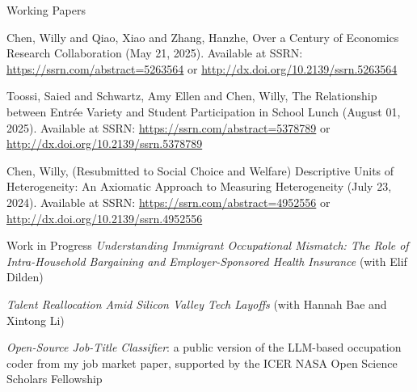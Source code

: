 \documentclass{resume} %
\begin{document}
\begin{rSection}{Working Papers}

Chen, Willy and Qiao, Xiao and Zhang, Hanzhe, Over a Century of Economics Research Collaboration (May 21, 2025). Available at SSRN: \url{https://ssrn.com/abstract=5263564} or \url{http://dx.doi.org/10.2139/ssrn.5263564}

Toossi, Saied and Schwartz, Amy Ellen and Chen, Willy, The Relationship between Entrée Variety and Student Participation in School Lunch (August 01, 2025). Available at SSRN: \url{https://ssrn.com/abstract=5378789} or \url{http://dx.doi.org/10.2139/ssrn.5378789}

Chen, Willy, (Resubmitted to Social Choice and Welfare) Descriptive Units of Heterogeneity: An Axiomatic Approach to Measuring Heterogeneity (July 23, 2024). Available at SSRN: \url{https://ssrn.com/abstract=4952556} or \url{http://dx.doi.org/10.2139/ssrn.4952556}




\end{rSection}




\begin{rSection}{Work in Progress}
\textit{Understanding Immigrant Occupational Mismatch: The Role of Intra-Household Bargaining and Employer-Sponsored Health Insurance }(with Elif Dilden)

\textit{Talent Reallocation Amid Silicon Valley Tech Layoffs} (with Hannah Bae and Xintong Li)

\textit{Open-Source Job-Title Classifier}: a public version of the LLM-based occupation coder from my job market paper, supported by the ICER NASA Open Science Scholars Fellowship
\end{rSection}
\end{document}
